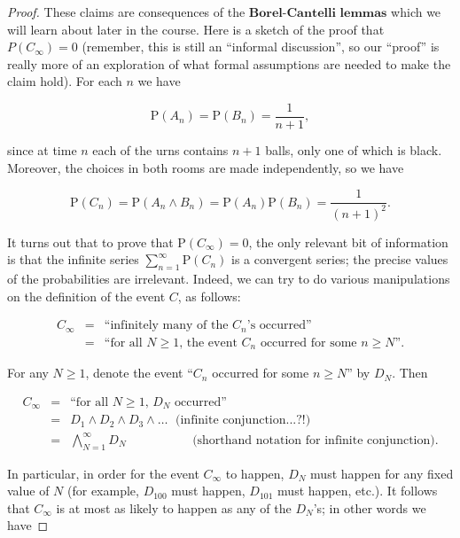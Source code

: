 \documentclass[11pt]{report}
\theoremstyle{plain}
\theoremstyle{definition}
\begin{document}
\begin{proof}
These claims are consequences of the
$\textbf{Borel-Cantelli lemmas}$ which we will learn
about later in the course. Here is a sketch of the
proof that $P(C_\infty)=0$ (remember, this is still
an ``informal discussion'', so our ``proof'' is really
more of an exploration of what formal assumptions are
needed to make the claim hold). For each $n$ we have

\[
\mathrm{P}(A_n) = \mathrm{P}(B_n) = \frac{1}{n+1},
\]

\noindent since at time $n$ each of the urns contains $n+1$
balls, only one of which is black. Moreover, the
choices in both rooms are made independently, so we
have

\[
\mathrm{P}(C_n) = \mathrm{P}(A_n \wedge B_n) = \mathrm{P}(A_n) \mathrm{P}(B_n) = \frac{1}{(n+1)^2}.
\]

\noindent It turns out that to prove that
$\mathrm{P}(C_\infty)=0$, the only relevant bit of
information is that the infinite series
$\sum_{n=1}^\infty \mathrm{P}(C_n)$ is a convergent
series; the precise values of the probabilities are
irrelevant. Indeed, we can try to do various
manipulations on the definition of the event $C$, as
follows:

\begin{eqnarray*}
C_\infty &=& \textrm{``infinitely many of the $C_n$'s occurred''} \\
&=& \textrm{``for all $N\ge 1$, the event $C_n$ occurred for some $n\ge N$''.}
\end{eqnarray*}

\noindent For any $N\ge 1$, denote the event ``$C_n$ occurred
for some $n\ge N$'' by $D_N$. Then

\begin{eqnarray*}
C_\infty &=& \textrm{``for all $N\ge 1$, $D_N$ occurred''} \\
&=& D_1 \wedge D_2 \wedge D_3 \wedge \ldots \ \ \, \textrm{(infinite conjunction...?!)} \\
&=& \bigwedge_{N=1}^\infty D_N \quad \qquad \quad\ \ \ \ \ \ \textrm{(shorthand notation for infinite conjunction)}.
\end{eqnarray*}

\noindent In particular, in order for the event $C_\infty$ to
happen, $D_N$ must happen for any fixed value of $N$
(for example, $D_{100}$ must happen, $D_{101}$ must
happen, etc.). It follows that $C_\infty$ is at most
as likely to happen as any of the $D_N$'s; in other
words we have


\end{proof}
\end{document}
